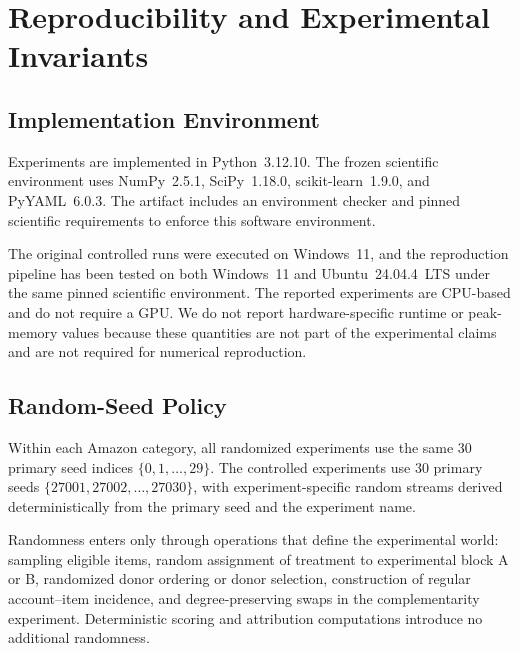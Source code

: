 \section{Reproducibility and Experimental Invariants}
\label{sec:supp-reproducibility}

\subsection{Implementation Environment}
\label{sec:supp-environment}

Experiments are implemented in Python~3.12.10. The frozen scientific
environment uses NumPy~2.5.1, SciPy~1.18.0, scikit-learn~1.9.0, and
PyYAML~6.0.3. The artifact includes an environment checker and pinned
scientific requirements to enforce this software environment.

The original controlled runs were executed on Windows~11, and the
reproduction pipeline has been tested on both Windows~11 and
Ubuntu~24.04.4~LTS under the same pinned scientific environment. The reported experiments are CPU-based
and do not require a GPU. We do not report hardware-specific runtime or
peak-memory values because these quantities are not part of the experimental
claims and are not required for numerical reproduction.


\subsection{Random-Seed Policy}
\label{sec:supp-seeds}

Within each Amazon category, all randomized experiments use the same
30 primary seed indices $\{0,1,\ldots,29\}$.
The controlled experiments use 30 primary seeds $\{27001,27002,\ldots,27030\}$,
with experiment-specific random streams derived deterministically from the primary
seed and the experiment name.

Randomness enters only through operations that define the experimental world:
sampling eligible items, random assignment of treatment to experimental block
A or B, randomized donor ordering or donor selection, construction of regular
account--item incidence, and degree-preserving swaps in the complementarity
experiment. Deterministic scoring and attribution computations introduce no
additional randomness.

